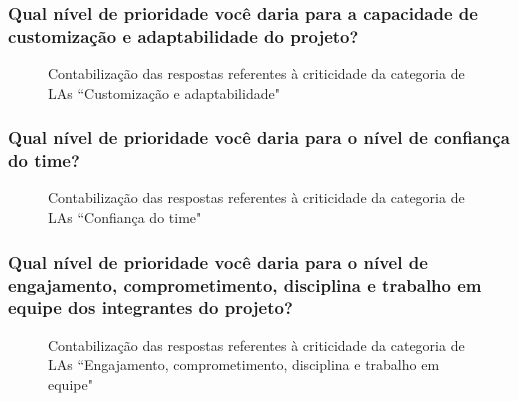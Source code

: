\subsubsection{Qual nível de prioridade você daria para a capacidade de customização e adaptabilidade do projeto?}

\begin{figure}[H]
	\centering
	\captionsetup{justification=centering,margin=2cm}
	\caption{Contabilização das respostas referentes à criticidade da categoria de LAs ``Customização e adaptabilidade"}
	\label{fig:result-adaptabilidade}
\end{figure}

\subsubsection{Qual nível de prioridade você daria para o nível de confiança do time?}

\begin{figure}[H]
	\centering
	\captionsetup{justification=centering,margin=2cm}
	\caption{Contabilização das respostas referentes à criticidade da categoria de LAs ``Confiança do time"}
	\label{fig:result-confianca}
\end{figure}

\subsubsection{Qual nível de prioridade você daria para o nível de engajamento, comprometimento, disciplina e trabalho em equipe dos integrantes do projeto?}

\begin{figure}[H]
	\centering
	\captionsetup{justification=centering}
	\caption{Contabilização das respostas referentes à criticidade da categoria de LAs ``Engajamento, comprometimento, disciplina e trabalho em equipe"}
	\label{fig:result-engajamento}
\end{figure}

